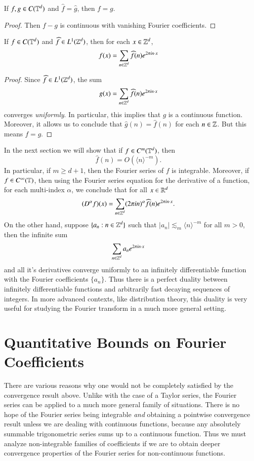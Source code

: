 \begin{corollary}
    If $f,g \in C(\operatorname{\mathbb{T}}^d)$ and $\widehat{f} = \widehat{g}$, then $f = g$.
\end{corollary}
\begin{proof}
    Then $f - g$ is continuous with vanishing Fourier coefficients.
\end{proof}

\begin{corollary}
    If $f \in C(\operatorname{\mathbb{T}}^d)$ and $\widehat{f} \in L^1(\operatorname{\mathbb{Z}}^d)$, then for each $x \in \operatorname{\mathbb{Z}}^d$,
    \[ f(x) = \sum_{n \in \operatorname{\mathbb{Z}}^d} \widehat{f}(n) e^{2 \pi i n \cdot x} \]
\end{corollary}
\begin{proof}
    Since $\widehat{f} \in L^1(\operatorname{\mathbb{Z}}^d)$, the sum
    \[ g(x) = \sum_{n \in \operatorname{\mathbb{Z}}^d} \widehat{f}(n) e^{2 \pi i n \cdot x} \]
    converges \emph{uniformly}. In particular, this implies that $g$ is a continuous function. Moreover, it allows us to conclude that $\widehat{g}(n) = \widehat{f}(n)$ for each $n \in \operatorname{\mathbb{Z}}$. But this means $f = g$.
\end{proof}

In the next section we will show that if $f \in C^m(\operatorname{\mathbb{T}}^d)$, then
%
\[ \widehat{f}(n) = O( \langle n \rangle^{-m} ). \]
%
In particular, if $m \geq d + 1$, then the Fourier series of $f$ is integrable. Moreover, if $f \in C^\infty(\operatorname{\mathbb{T}})$, then using the Fourier series equation for the derivative of a function, for each multi-index $\alpha$, we conclude that for all $x \in \operatorname{\mathbb{R}}^d$
%
\[ (D^\alpha f)(x) = \sum_{n \in \operatorname{\mathbb{Z}}^d} (2 \pi i n)^\alpha \widehat{f}(n) e^{2 \pi i n \cdot x}. \]
%
On the other hand, suppose $\{ a_n : n \in \operatorname{\mathbb{Z}}^d \}$ such that $|a_n| \lesssim_m \langle n \rangle^{-m}$ for all $m > 0$, then the infinite sum
%
\[ \sum_{n \in \operatorname{\mathbb{Z}}^d} a_n e^{2 \pi i n \cdot x} \]
%
and all it's derivatives converge uniformly to an infinitely differentiable function with the Fourier coefficients $\{ a_n \}$. Thus there is a perfect duality between infinitely differentiable functions and arbitrarily fast decaying sequences of integers. In more advanced contexts, like distribution theory, this duality is very useful for studying the Fourier transform in a much more general setting.

\section{Quantitative Bounds on Fourier Coefficients}

There are various reasons why one would not be completely satisfied by the convergence result above. Unlike with the case of a Taylor series, the Fourier series can be applied to a much more general family of situations. There is no hope of the Fourier series being integrable \emph{and} obtaining a pointwise convergence result unless we are dealing with continuous functions, because any absolutely summable trigonometric series sums up to a continuous function. Thus we must analyze non-integrable families of coefficients if we are to obtain deeper convergence properties of the Fourier series for non-continuous functions.

